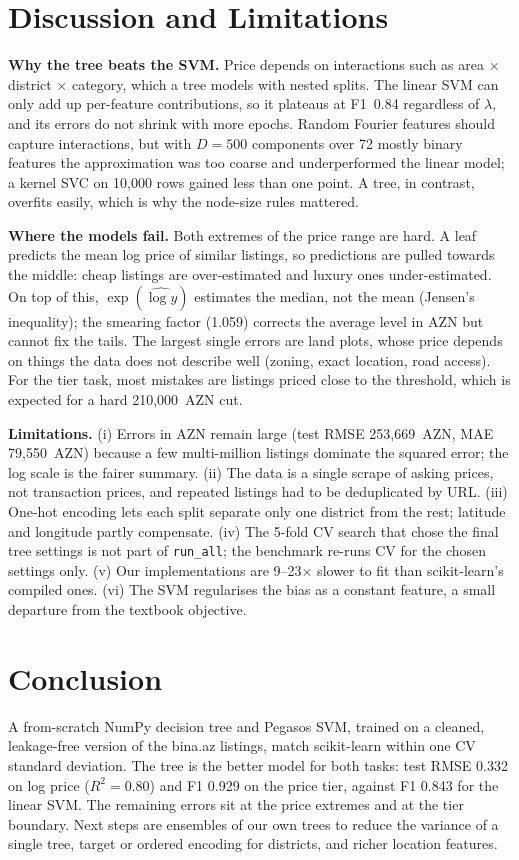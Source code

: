 \documentclass[10pt,twocolumn,a4paper]{article}
\newcommand{\code}[1]{\texttt{#1}}
\begin{document}
\section{Discussion and Limitations}
\textbf{Why the tree beats the SVM.} Price depends on interactions such as
area $\times$ district $\times$ category, which a tree models with nested
splits. The linear SVM can only add up per-feature contributions, so it
plateaus at F1~0.84 regardless of $\lambda$, and its errors do not shrink
with more epochs. Random Fourier features should capture interactions,
but with $D=500$ components over 72 mostly binary features the
approximation was too coarse and underperformed the linear model; a
kernel SVC on 10,000 rows gained less than one point. A tree, in
contrast, overfits easily, which is why the node-size rules mattered.

\textbf{Where the models fail.} Both extremes of the price range are hard.
A leaf predicts the mean log price of similar listings, so predictions are
pulled towards the middle: cheap listings are over-estimated and luxury
ones under-estimated. On top of this, $\exp(\widehat{\log y})$ estimates
the median, not the mean (Jensen's inequality); the smearing factor
(1.059) corrects the average level in AZN but cannot fix the tails. The
largest single errors are land plots, whose price depends on things the
data does not describe well (zoning, exact location, road access). For
the tier task, most mistakes are listings priced close to the threshold,
which is expected for a hard 210,000~AZN cut.

\textbf{Limitations.} (i) Errors in AZN remain large (test RMSE
253,669~AZN, MAE 79,550~AZN) because a few multi-million listings dominate
the squared error; the log scale is the fairer summary. (ii) The data is a
single scrape of asking prices, not transaction prices, and repeated
listings had to be deduplicated by URL. (iii) One-hot encoding lets each
split separate only one district from the rest; latitude and longitude
partly compensate. (iv) The 5-fold CV search that chose the final tree
settings is not part of \code{run\_all}; the benchmark re-runs CV for the
chosen settings only. (v) Our implementations are 9--23$\times$ slower to
fit than scikit-learn's compiled ones. (vi) The SVM regularises the bias
as a constant feature, a small departure from the textbook objective.

\section{Conclusion}
A from-scratch NumPy decision tree and Pegasos SVM, trained on a cleaned,
leakage-free version of the bina.az listings, match scikit-learn within
one CV standard deviation. The tree is the better model for both tasks:
test RMSE 0.332 on log price ($R^2=0.80$) and F1 0.929 on the price tier,
against F1 0.843 for the linear SVM. The remaining errors sit at the price
extremes and at the tier boundary. Next steps are ensembles of our own
trees to reduce the variance of a single tree, target or ordered encoding
for districts, and richer location features.
\end{document}
